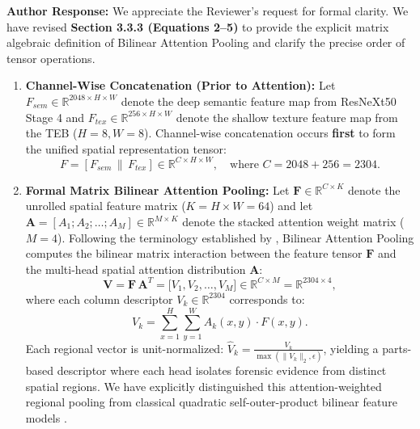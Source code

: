 \documentclass[runningheads]{llncs}
\begin{document}
\noindent\textbf{Author Response:} We appreciate the Reviewer's request for formal clarity. We have revised \textbf{Section 3.3.3 (Equations 2--5)} to provide the explicit matrix algebraic definition of Bilinear Attention Pooling and clarify the precise order of tensor operations.

\begin{enumerate}
    \item \textbf{Channel-Wise Concatenation (Prior to Attention):}  
    Let $F_{sem} \in \mathbb{R}^{2048 \times H \times W}$ denote the deep semantic feature map from ResNeXt50 Stage 4 and $F_{tex} \in \mathbb{R}^{256 \times H \times W}$ denote the shallow texture feature map from the TEB ($H=8, W=8$). Channel-wise concatenation occurs \textbf{first} to form the unified spatial representation tensor:
    \begin{equation}
        F = [F_{sem} \,\|\, F_{tex}] \in \mathbb{R}^{C \times H \times W}, \quad \text{where } C = 2048 + 256 = 2304.
    \end{equation}

    \item \textbf{Formal Matrix Bilinear Attention Pooling:}  
    Let $\mathbf{F} \in \mathbb{R}^{C \times K}$ denote the unrolled spatial feature matrix ($K = H \times W = 64$) and let $\mathbf{A} = [A_1; A_2; \dots; A_M] \in \mathbb{R}^{M \times K}$ denote the stacked attention weight matrix ($M=4$). Following the terminology established by \citet{Zhao2021MultiAttentional}, Bilinear Attention Pooling computes the bilinear matrix interaction between the feature tensor $\mathbf{F}$ and the multi-head spatial attention distribution $\mathbf{A}$:
    \begin{equation}
        \mathbf{V} = \mathbf{F} \, \mathbf{A}^T = \big[V_1, V_2, \dots, V_M\big] \in \mathbb{R}^{C \times M} = \mathbb{R}^{2304 \times 4},
    \end{equation}
    where each column descriptor $V_k \in \mathbb{R}^{2304}$ corresponds to:
    \begin{equation}
        V_k = \sum_{x=1}^{H} \sum_{y=1}^{W} A_k(x,y) \cdot F(x,y).
    \end{equation}
    Each regional vector is unit-normalized: $\hat{V}_k = \frac{V_k}{\max(\|V_k\|_2, \epsilon)}$, yielding a parts-based descriptor where each head isolates forensic evidence from distinct spatial regions. We have explicitly distinguished this attention-weighted regional pooling from classical quadratic self-outer-product bilinear feature models \citep{Lin2015Bilinear}.
\end{enumerate}
\end{document}
